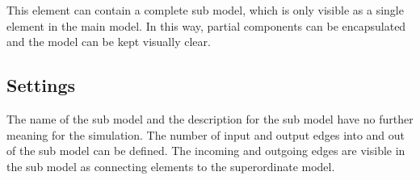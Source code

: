 This element can contain a complete sub model, which is only visible as a single element in the main model.
In this way, partial components can be encapsulated and the model can be kept visually clear.

\subsection*{Settings}

The name of the sub model and the description for the sub model have
no further meaning for the simulation.
The number of input and output edges into and out of the sub model can
be defined. The incoming and outgoing edges are visible in the sub model
as connecting elements to the superordinate model.





